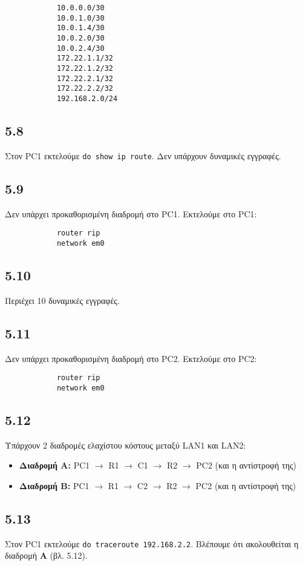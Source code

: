 \documentclass[a4paper, 12pt]{article}
\begin{document}
		\begin{verbatim}
			10.0.0.0/30
			10.0.1.0/30
			10.0.1.4/30
			10.0.2.0/30
			10.0.2.4/30
			172.22.1.1/32
			172.22.1.2/32
			172.22.2.1/32
			172.22.2.2/32
			192.168.2.0/24
		\end{verbatim}

	\subsection*{5.8}
		Στον PC1 εκτελούμε \verb|do show ip route|. Δεν υπάρχουν δυναμικές εγγραφές.

	\subsection*{5.9}
		Δεν υπάρχει προκαθορισμένη διαδρομή στο PC1. Εκτελούμε στο PC1:
		
		\begin{verbatim}
			router rip
			network em0
		\end{verbatim}

	\subsection*{5.10}
		Περιέχει 10 δυναμικές εγγραφές.

	\subsection*{5.11}
		Δεν υπάρχει προκαθορισμένη διαδρομή στο PC2. Εκτελούμε στο PC2:
		
		\begin{verbatim}
			router rip
			network em0
		\end{verbatim}

	\subsection*{5.12}
		Υπάρχουν 2 διαδρομές ελαχίστου κόστους μεταξύ LAN1 και LAN2:
		
		\begin{itemize}
			\item \textbf{Διαδρομή Α:} PC1 $\rightarrow$ R1 $\rightarrow$ C1 $\rightarrow$ R2 $\rightarrow$ PC2  (και η αντίστροφή της)
			\item \textbf{Διαδρομή Β:} PC1 $\rightarrow$ R1 $\rightarrow$ C2 $\rightarrow$ R2 $\rightarrow$ PC2 (και η αντίστροφή της)
		\end{itemize}

	\subsection*{5.13}
		Στον PC1 εκτελούμε \verb|do traceroute 192.168.2.2|. Βλέπουμε ότι ακολουθείται η διαδρομή \textbf{A} (βλ. 5.12).
\end{document}
